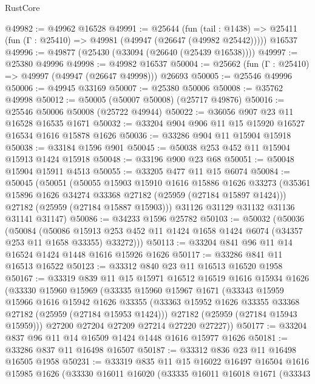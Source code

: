 \begin{lexlean}{RustCore}
\begin{coremodule}
@49982 := @49962 @16528
@49991 := @25644
    (fun (tail : @1438) => @25411 (fun (Γ : @25410) => @49981 (@49947 (@26647 (@49982 @25442)))))
    @16537
@49996 := @49877 (@25430 (@33094 (@26640 (@25439 @16538))))
@49997 := @25380 @49996
@49998 := @49982 @16537
@50004 := @25662 (fun (Γ : @25410) => @49997 (@49947 (@26647 @49998))) @26693
@50005 := @25546 @49996
@50006 := @49945 @33169
@50007 := @25380 @50006
@50008 := @35762 @49998
@50012 := @50005 (@50007 @50008) (@25717 @49876)
@50016 := @25546 @50006 @50008 (@25722 @49944)
@50022 := @36056 @907 @23 @11 @16528 @16535 @1671
@50032 := @33204 @904 @906 @11 @15 @15920 @16527 @16534 @1616 @15878 @1626
@50036 := @33286 @904 @11 @15904 @15918
@50038 := @33184 @1596 @901
@50045 := @50038 @253 @452 @11 @15904 @15913 @1424 @15918
@50048 := @33196 @900 @23 @68
@50051 := @50048 @15904 @15911 @4513
@50055 := @33205 @477 @11 @15 @6074
@50084 := @50045
    (@50051
      (@50055
        @15903
        @15910
        @1616
        @15886
        @1626
        @33273
        (@35361 @15896 @1626 @34274 @33368 @27182 (@25959 (@27184 @15897 @1424)))
        @27182
        (@25959 (@27184 @15887 @15903)))
      @31126
      @31129
      @31132
      @31136
      @31141
      @31147)
@50086 := @34233 @1596 @25782
@50103 := @50032
    (@50036
      (@50084
        (@50086
          @15913
          @253
          @452
          @11
          @1424
          @1658
          @1424
          @6074
          (@34357 @253 @11 @1658 @33355)
          @33272)))
@50113 := @33204 @841 @96 @11 @14 @16524 @1424 @1448 @1616 @15926 @1626
@50117 := @33286 @841 @11 @16513 @16522
@50123 := @33312 @840 @23 @11 @16513 @16520 @1958
@50167 := @33319
    @839
    @11
    @15
    @15971
    @16512
    @16519
    @1616
    @15934
    @1626
    (@33330
      @15960
      @15969
      (@33335
        @15960
        @15967
        @1671
        (@33343
          @15959
          @15966
          @1616
          @15942
          @1626
          @33355
          (@33363 @15952 @1626 @33355 @33368 @27182 (@25959 (@27184 @15953 @1424)))
          @27182
          (@25959 (@27184 @15943 @15959)))
        @27200
        @27204
        @27209
        @27214
        @27220
        @27227))
@50177 := @33204 @837 @96 @11 @14 @16509 @1424 @1448 @1616 @15977 @1626
@50181 := @33286 @837 @11 @16498 @16507
@50187 := @33312 @836 @23 @11 @16498 @16505 @1958
@50231 := @33319
    @835
    @11
    @15
    @16022
    @16497
    @16504
    @1616
    @15985
    @1626
    (@33330
      @16011
      @16020
      (@33335
        @16011
        @16018
        @1671
        (@33343

\end{coremodule}
\end{lexlean}
